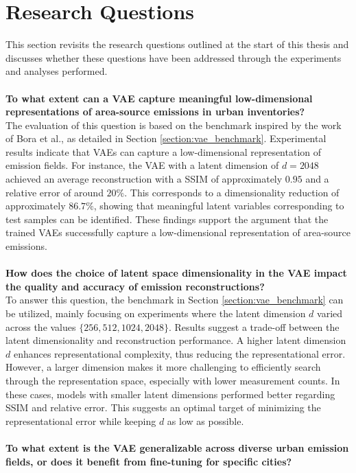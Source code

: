 \section{Research Questions}
This section revisits the research questions outlined at the start of this thesis and discusses whether these questions have been addressed through the experiments and analyses performed.
\\\\
\textbf{To what extent can a \gls{VAE} capture meaningful low-dimensional representations of area-source emissions in urban inventories?}
\\
The evaluation of this question is based on the benchmark inspired by the work of Bora et al., as detailed in Section \ref{section:vae_benchmark}.
Experimental results indicate that \gls{VAE}s can capture a low-dimensional representation of emission fields.
For instance, the \gls{VAE} with a latent dimension of $d=2048$ achieved an average reconstruction with a \gls{SSIM} of approximately $0.95$ and a relative error of around $20\%$.
This corresponds to a dimensionality reduction of approximately $86.7\%$, showing that meaningful latent variables corresponding to test samples can be identified.
These findings support the argument that the trained \gls{VAE}s successfully capture a low-dimensional representation of area-source emissions.
\\\\
\textbf{How does the choice of latent space dimensionality in the \gls{VAE} impact the quality and accuracy of emission reconstructions?}
\\
To answer this question, the benchmark in Section \ref{section:vae_benchmark} can be utilized, mainly focusing on experiments where the latent dimension $d$ varied across the values $\{ 256, 512, 1024, 2048 \}$.
Results suggest a trade-off between the latent dimensionality and reconstruction performance.
A higher latent dimension $d$ enhances representational complexity, thus reducing the representational error.
However, a larger dimension makes it more challenging to efficiently search through the representation space, especially with lower measurement counts.
In these cases, models with smaller latent dimensions performed better regarding \gls{SSIM} and relative error.
This suggests an optimal target of minimizing the representational error while keeping $d$ as low as possible.
\\\\
\textbf{To what extent is the \gls{VAE} generalizable across diverse urban emission fields, or does it benefit from fine-tuning for specific cities?}
